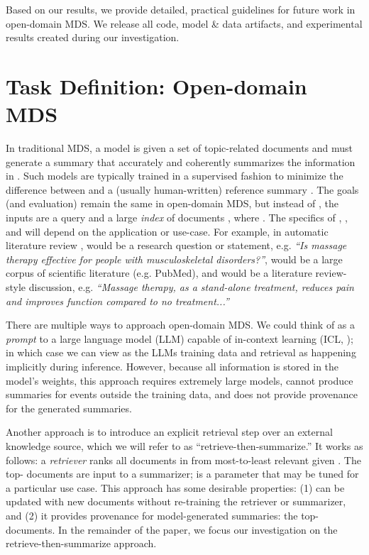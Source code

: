 \documentclass[11pt]{article}
\begin{document}
\noindent Based on our results, we provide detailed, practical guidelines for future work in open-domain MDS. We release all code, model \& data artifacts, and experimental results created during our investigation.

\vspace{-1.0mm}
\section{Task Definition: Open-domain MDS}
\label{open-mds}
\vspace{-1.0mm}

In traditional MDS, a model is given a set of topic-related documents  and must generate a summary  that accurately and coherently summarizes the information in . Such models are typically trained in a supervised fashion to minimize the difference between  and a (usually human-written) reference summary . The goals (and evaluation) remain the same in open-domain MDS, but instead of , the inputs are a query  and a large \textit{index} of documents , where . The specifics of , , and  will depend on the application or use-case. For example, in automatic literature review \citep{cochrane, deyoung-etal-2021-ms},  would be a research question or statement, e.g. \textit{``Is massage therapy effective for people with musculoskeletal disorders?''},  would be a large corpus of scientific literature (e.g. PubMed), and  would be a literature review-style discussion, e.g. \textit{``Massage therapy, as a stand-alone treatment, reduces pain and improves function compared to no treatment...''}

There are multiple ways to approach open-domain MDS. We could think of  as a \textit{prompt} to a large language model (LLM) capable of in-context learning (ICL, \citealt{GPT3}); in which case we can view  as the LLMs training data and retrieval as happening implicitly during inference. However, because all information is stored in the model's weights, this approach requires extremely large models, cannot produce summaries for events outside the training data, and does not provide provenance for the generated summaries. 

Another approach is to introduce an explicit retrieval step over an external knowledge source, which we will refer to as ``retrieve-then-summarize.'' It works as follows: a \textit{retriever} ranks all documents in  from most-to-least relevant given . The top- documents are input to a summarizer;  is a parameter that may be tuned for a particular use case. This approach has some desirable properties: (1)  can be updated with new documents without re-training the retriever or summarizer, and (2) it provides provenance for model-generated summaries: the top- documents. In the remainder of the paper, we focus our investigation on the retrieve-then-summarize approach.
\end{document}
